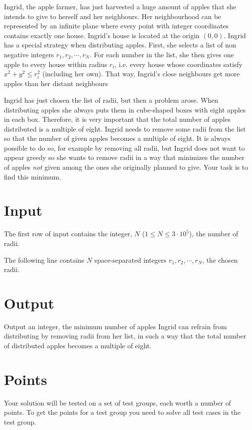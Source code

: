\def\version{1}

Ingrid, the apple farmer, has just harvested a huge amount of apples that she intends to give
to herself and her neighbours. Her neighbourhood can be represented by an infinite plane
where every point with integer coordinates contains exactly one house. Ingrid's house is
located at the origin $(0, 0)$. Ingrid has a special strategy when distributing apples. First, she
selects a list of non negative integers $r_1, r_2, \cdots, r_N$. For each number in the list, she then
gives one apple to every house within radius $r_i$, i.e. every house whose coordinates satisfy $x^2+y^2 \leq r_i^2$
(including her own). That way, Ingrid's close neighbours get more apples than
her distant neighbours

Ingrid has just chosen the list of radii, but then a problem arose. When distributing apples
she always puts them in cube-shaped boxes with eight apples in each box. Therefore, it is
very important that the total number of apples distributed is a multiple of eight. Ingrid needs
to remove some radii from the list so that the number of given apples becomes a multiple of
eight. It is always possible to do so, for example by removing all radii, but Ingrid does not
want to appear greedy so she wants to remove radii in a way that minimizes the number of
apples \textit{not} given among the ones she originally planned to give. Your task is to find this
minimum.

\section*{Input}
\noindent
The first row of input contains the integer, $N$ ($1 \leq N \leq 3 \cdot 10^5$), the number of radii.

The following line contains $N$ space-separated integers $r_1, r_2, \cdots, r_N$, the chosen radii.

\section*{Output}
\noindent
Output an integer, the minimum number of apples Ingrid can refrain from distributing by
removing radii from her list, in such a way that the total number of distributed apples
becomes a multiple of eight.

\section*{Points}
\noindent
Your solution will be tested on a set of test groups, each worth a number of points.
To get the points for a test group you need to solve all test cases in the test group.

